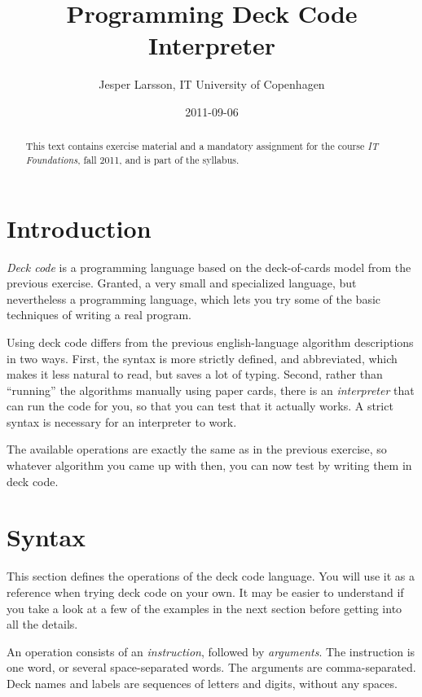 \documentclass[a4paper,twoside]{tufte-handout}
\title{Programming Deck Code Interpreter}
\author{Jesper Larsson, IT University of Copenhagen}
\date{2011-09-06}
\begin{document}
\maketitle

\begin{abstract}
  This text contains exercise material and a mandatory assignment for
  the course \emph{IT Foundations}, fall 2011, and is part of the
  syllabus.
\end{abstract}

\section{Introduction}\label{sec-intro}

\emph{Deck code} is a programming language based on the deck-of-cards
model from the previous exercise. Granted, a very small and
specialized language, but nevertheless a programming language, which
lets you try some of the basic techniques of writing a real program.

Using deck code differs from the previous english-language algorithm
descriptions in two ways. First, the syntax is more strictly defined,
and abbreviated, which makes it less natural to read, but saves a
lot of typing. Second, rather than ``running'' the algorithms manually
using paper cards, there is an \emph{interpreter} that can run the
code for you, so that you can test that it actually works. A strict
syntax is necessary for an interpreter to work.

The available operations are exactly the same as in the previous
exercise, so whatever algorithm you came up with then, you can now
test by writing them in deck code.

\section{Syntax}\label{sec-syntax}

This section defines the operations of the deck code language. You
will use it as a reference when trying deck code on your own. It may
be easier to understand if you take a look at a few of the examples in
the next section before getting into all the details.

An operation consists of an \emph{instruction}, followed by
\emph{arguments}. The instruction is one word, or several
space-separated words. The arguments are comma-separated. Deck names
and labels are sequences of letters and digits, without any spaces.
\end{document}

